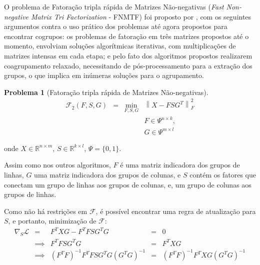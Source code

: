 \documentclass[
    12pt,                %
    oneside,            %
    a4paper,            %
    english,            %
    brazil                %
    ]{abntex2ppgsi}
\newtheorem{problem}{Problema}
\newcommand{\norm}[1]{\left\lVert#1\right\rVert}
\begin{document}
O problema de Fatoração tripla rápida de Matrizes Não-negativas (\textit{Fast Non-negative Matrix Tri Factorization} - FNMTF) foi proposto por , com os seguintes argumentos contra o uso prático dos problemas até agora propostos para encontrar cogrupos: os problemas de fatoração em três matrizes propostos até o momento, envolviam soluções algorítmicas iterativas, com multiplicações de matrizes intensas em cada etapa; e pelo fato dos algoritmos propostos realizarem coagrupamento relaxado, necessitando de pós-processamento para a extração dos grupos, o que implica em inúmeras soluções para o agrupamento.

\begin{problem}[Fatoração tripla rápida de Matrizes Não-negativas]
\label{def:fnmtf:problem}
\begin{equation}
    \begin{array}{lclcl}
        \displaystyle \mathcal{F}_2(F, S, G) & = & \displaystyle \min_{F, S, G} & \norm{X - FSG^T}^{2}_{F} \\
                                             &   &                              & F \in \Psi^{n \times k}, \\
                                             &   &                              & G \in \Psi^{m \times l}
    \end{array}
\end{equation}
\end{problem}

onde $X \in \mathbb{R}^{n \times m}$, $S \in \mathbb{R}^{k \times l}$, $\Psi = \{0, 1\}$.

Assim como nos outros algoritmos, $F$ é uma matriz indicadora dos grupos de linhas, $G$ uma matriz indicadora dos grupos de colunas, e $S$ contém os fatores que conectam um grupo de linhas aos grupos de colunas, e, um grupo de colunas aos grupos de linhas.

Como não há restrições em $\mathcal{F}$, é possível encontrar uma regra de atualização para $S$, e portanto, minimização de $\mathcal{F}$:
\[
    \begin{array}{lclcl}
        \nabla_S \mathcal{L} &     =       & F^T X G - F^T F S G^T G                 & = & 0                                 \\
                             & \implies    & F^TFSG^TG                               & = & F^TXG                             \\
                             & \implies    & (F^T F)^{-1} F^T F S G^T G (G^T G)^{-1} & = & (F^T F)^{-1} F^T X G (G^T G)^{-1}
    \end{array}
\]
\end{document}
